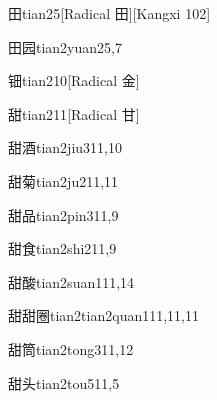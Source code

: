 \begin{entry}{田}{tian2}{5}[Radical 田][Kangxi 102]
\end{entry}

\begin{entry}{田园}{tian2yuan2}{5,7}
\end{entry}

\begin{entry}{钿}{tian2}{10}[Radical 金]
\end{entry}

\begin{entry}{甜}{tian2}{11}[Radical 甘]
\end{entry}

\begin{entry}{甜酒}{tian2jiu3}{11,10}
\end{entry}

\begin{entry}{甜菊}{tian2ju2}{11,11}
\end{entry}

\begin{entry}{甜品}{tian2pin3}{11,9}
\end{entry}

\begin{entry}{甜食}{tian2shi2}{11,9}
\end{entry}

\begin{entry}{甜酸}{tian2suan1}{11,14}
\end{entry}

\begin{entry}{甜甜圈}{tian2tian2quan1}{11,11,11}
\end{entry}

\begin{entry}{甜筒}{tian2tong3}{11,12}
\end{entry}

\begin{entry}{甜头}{tian2tou5}{11,5}
\end{entry}

